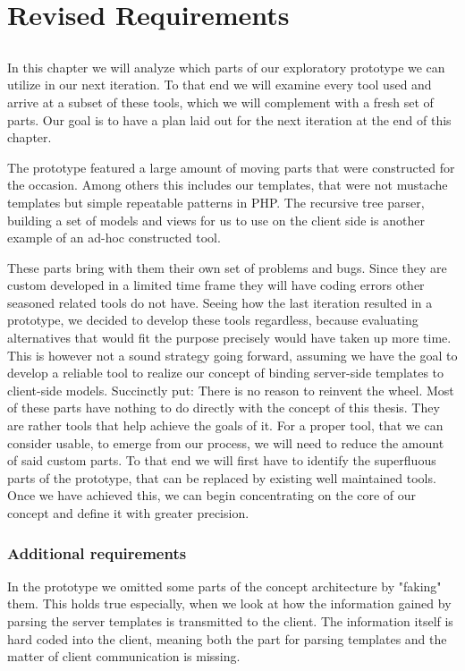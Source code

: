 \chapter{Revised Requirements}
\section{}
In this chapter we will analyze which parts of our exploratory prototype we can
utilize in our next iteration. To that end we will examine every tool used and
arrive at a subset of these tools, which we will complement with a fresh set of
parts. Our goal is to have a plan laid out for the next iteration at the end of
this chapter.

The prototype featured a large amount of moving parts that were constructed for
the occasion. Among others this includes our templates, that were not mustache
templates but simple repeatable patterns in PHP. The recursive tree parser,
building a set of models and views for us to use on the client side is another
example of an ad-hoc constructed tool.

These parts bring with them their own set of problems and bugs.
Since they are custom developed in a limited time frame they will have coding
errors other seasoned related tools do not have.
Seeing how the last iteration resulted in a prototype,
we decided to develop these tools regardless,
because evaluating alternatives that would fit the purpose precisely
would have taken up more time.
This is however not a sound strategy going forward, assuming we have the goal to
develop a reliable tool to realize our concept of binding server-side templates
to client-side models.
Succinctly put: There is no reason to reinvent the wheel.
Most of these parts have nothing to do directly with the concept of this thesis.
They are rather tools that help achieve the goals of it.
For a proper tool, that we can consider usable, to emerge from our process,
we will need to reduce the amount of said custom parts.
To that end we will first have to identify the superfluous parts of the
prototype, that can be replaced by existing well maintained tools. Once we have
achieved this, we can begin concentrating on the core of our concept and define
it with greater precision.

\subsection{Additional requirements}
In the prototype we omitted some parts of the concept architecture by "faking"
them. This holds true especially, when we look at how the information gained
by parsing the server templates is transmitted to the client.
The information itself is hard coded into the client, meaning both the part for
parsing templates and the matter of client communication is missing.

